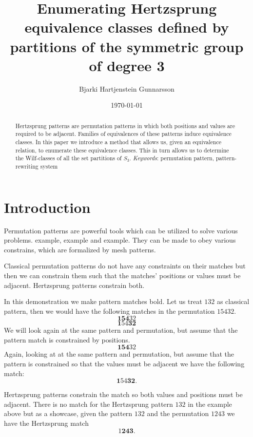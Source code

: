 \documentclass[a4paper, 11pt, english]{article}
\newcommand{\breath}{\vspace{6pt plus 2pt minus 1pt}\noindent}
\theoremstyle{definition}
\newcommand{\Sym}{S}
\begin{document}
\title{Enumerating Hertzsprung equivalence classes defined by partitions of the symmetric group of degree 3}
\author{Bjarki Hartjenstein Gunnarsson}
\date{\today}
\maketitle

\begin{abstract}
    Hertzsprung patterns are permutation patterns in which both positions and
    values are required to be adjacent. Families of equivalences of these
    patterns induce equivalence classes. In this paper we introduce a method
    that allows us, given an equivalence relation, to enumerate these
    equivalence classes. This in turn allows us to determine the Wilf-classes of
    all the set partitions of $\Sym_3$.
    \breath \emph{Keywords}: permutation pattern, pattern-rewriting system
\end{abstract}

\section{Introduction}
Permutation patterns are powerful tools which can be utilized to solve various
problems. example, example and example. They can be made to obey various
constrains, which are formalized by mesh patterns. \cite{claesson:2011}

Classical permutation patterns do not have any constraints on their matches but then we can
constrain them such that the matches' positions or values must be adjacent.
Hertzsprung patterns constrain both. 

In this demonstration we make pattern matches bold.  Let us treat $132$ as classical
pattern, then we would have the following matches in the permutation $15432$.
\[
    \bm{154}32
\]
\[
    \bm{1}54\bm{32}
\]
We will look again at the same pattern and permutation, but assume that the
pattern match is constrained by positions.
\[
    \bm{154}32
\]
Again, looking at at the same pattern and permutation, but assume that the
pattern is constrained so that the values must be adjacent we have the following
match:
\[
    \bm{1}54\bm{32}.
\]

Hertzsprung patterns constrain the match so both values and positions must be
adjacent. There is no match for the Hertzsprung pattern $132$ in the example
above but as a showcase, given the pattern $132$ and the permutation $1243$ we
have the Hertzsprung match
\[
    1\bm{243}.
\]
\end{document}
